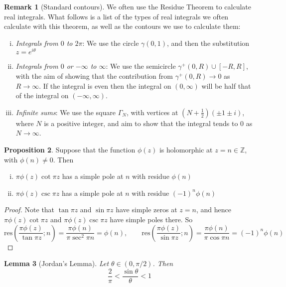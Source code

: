\documentclass[10pt,fleqn]{article}
\newcommand{\res}{\mathrm{res}}
\theoremstyle{definition} \newtheorem{defn}{Definition}[section]
\theoremstyle{plain}      \newtheorem{thm}[defn]{Theorem}
\theoremstyle{definition} \newtheorem{prop}[defn]{Proposition}
\theoremstyle{plain}      \newtheorem{lem}[defn]{Lemma}
\theoremstyle{definition} \newtheorem{cor}[defn]{Corollary}
\theoremstyle{definition} \newtheorem{ex}[defn]{Example}
\theoremstyle{definition} \newtheorem{rem}[defn]{Remark}
\begin{document}
\begin{rem}[Standard contours]
    We often use the Residue Theorem to calculate real integrals.
    What follows is a list of the types of real integrals we often calculate with this theorem, as well as the contours we use to calculate them:
    \begin{enumerate}[(i)]
        \item \emph{Integrals from $0$ to $2\pi$}:
        We use the circle $\gamma(0,1)$, and then the substitution $z=e^{i\theta}$
        \item \emph{Integrals from $0$ or $-\infty$ to $\infty$}:
        We use the semicircle $\gamma^+(0,R)\cup[-R,R]$, with the aim of showing that the contribution from $\gamma^+(0,R)\to0$ as $R\to\infty$.
        If the integral is even then the integral on $(0,\infty)$ will be half that of the integral on $(-\infty,\infty)$.
        \item \emph{Infinite sums}:
        We use the square $\Gamma_N$, with vertices at $(N+\frac{1}{2})(\pm1\pm i)$, where $N$ is a positive integer, and aim to show that the integral tends to 0 as $N\to\infty$.
    \end{enumerate}
\end{rem}

\begin{prop}
    Suppose that the function $\phi(z)$ is holomorphic at $z=n\in\mathbb{Z}$, with $\phi(n)\neq0$.
    Then
    \begin{enumerate}[(i)]
        \item $\pi\phi(z)\cot\pi z$ has a simple pole at $n$ with residue $\phi(n)$
        \item $\pi\phi(z)\csc\pi z$ has a simple pole at $n$ with residue $(-1)^n\phi(n)$
    \end{enumerate}
\end{prop}

\begin{proof}
    Note that $\tan\pi z$ and $\sin\pi z$ have simple zeros at $z=n$, and hence $\pi\phi(z)\cot\pi z$ and $\pi\phi(z)\csc\pi z$ have simple poles there.
    So
    \[
        \res\left(\frac{\pi\phi(z)}{\tan\pi z};n\right)=
        \frac{\pi\phi(n)}{\pi\sec^2\pi n}=
        \phi(n),\qquad
        \res\left(\frac{\pi\phi(z)}{\sin\pi z};n\right)=
        \frac{\pi\phi(n)}{\pi\cos\pi n}=
        (-1)^n\phi(n)
    \]
\end{proof}

\begin{lem}[Jordan's Lemma]
    Let $\theta\in(0,\pi/2)$.
    Then
    \begin{equation}
        \frac{2}{\pi}<
        \frac{\sin\theta}{\theta}<
        1
    \end{equation}
\end{lem}
\end{document}
